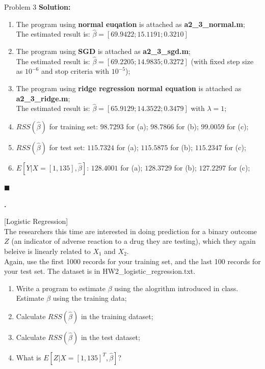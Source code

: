 \documentclass{article}
\newcounter{pcounter}                                   %
\newenvironment{problem}                                %
{                                                       %
    \color{gray}                                        %
    \stepcounter{pcounter}                              %
    \textbf{\arabic{pcounter}.}                         %
}{}                                                     %
\newenvironment{solution}                               %
{\textbf{Solution:} }{$\blacksquare$}                   %
\begin{document}
\begin{section}{Problem 3}
        \begin{solution}
            \begin{enumerate}[label=(\alph*)]
                \item The program using \textbf{normal euqation} is attached as \textbf{a2\_3\_normal.m};\\
                The estimated result is: $\hat{\beta} = [69.9422; 15.1191; 0.3210]$
                
                \item The program using \textbf{SGD} is attached as \textbf{a2\_3\_sgd.m};\\
                The estimated result is: $\hat{\beta} = [69.2205; 14.9835; 0.3272]$ (with fixed step size as $10^{-6}$ and stop criteria with $10^{-5}$);
                
                \item The program using \textbf{ridge regression normal equation} is attached as \textbf{a2\_3\_ridge.m};\\
                The estimated result is: $\hat{\beta} = [65.9129; 14.3522; 0.3479]$ with $\lambda=1$;
                
                \item $RSS(\hat{\beta})$ for training set: $98.7293$ for (a); $98.7866$ for (b); $99.0059$ for (c);
                \item $RSS(\hat{\beta})$ for test set: $115.7324$ for (a); $115.5875$ for (b); $115.2347$ for (c);
                \item $E[Y|X=[1,135], \hat{\beta}]$: $128.4001$ for (a); $128.3729$ for (b); $127.2297$ for (c);
            \end{enumerate}
        \end{solution}

        \begin{problem}
            [Logistic Regression]\\
            The researchers this time are interested in doing prediction for a binary outcome $Z$ (an indicator of adverse reaction to a drug they are testing), which they again beleive is linearly related to $X_1$ and $X_2$.\\
            Again, use the first 1000 records for your training set, and the last 100 records for your test set. The dataset is in HW2\_logistic\_regression.txt.
            \begin{enumerate}[label=(\alph*)]
                \item Write a program to estimate $\beta$ using the alogrithm introduced in class. Estimate $\beta$ using the training data;
                \item Calculate $RSS(\hat{\beta})$ in the training dataset;
                \item Calculate $RSS(\hat{\beta})$ in the test dataset;
                \item What is $E[Z|X=[1,135]^T, \hat{\beta}]$?
            \end{enumerate}
        \end{problem}


\end{section}
\end{document}
